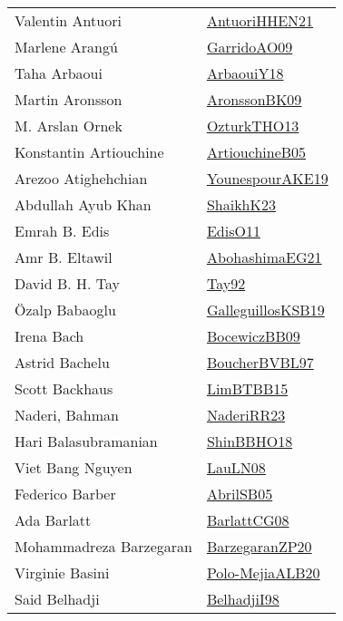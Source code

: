 {\begin{longtable}{p{4cm}p{20cm}}
Valentin Antuori & \href{papers/AntuoriHHEN21.pdf}{AntuoriHHEN21}\cite{AntuoriHHEN21} \\
Marlene Arang{\'{u}} & \href{articles/GarridoAO09.pdf}{GarridoAO09}\cite{GarridoAO09} \\
Taha Arbaoui & \href{papers/ArbaouiY18.pdf}{ArbaouiY18}\cite{ArbaouiY18} \\
Martin Aronsson & \href{papers/AronssonBK09.pdf}{AronssonBK09}\cite{AronssonBK09} \\
M. Arslan Ornek & \href{articles/OzturkTHO13.pdf}{OzturkTHO13}\cite{OzturkTHO13} \\
Konstantin Artiouchine & \href{papers/ArtiouchineB05.pdf}{ArtiouchineB05}\cite{ArtiouchineB05} \\
Arezoo Atighehchian & \href{}{YounespourAKE19}\cite{YounespourAKE19} \\
Abdullah Ayub Khan & \href{}{ShaikhK23}\cite{ShaikhK23} \\
Emrah B. Edis & \href{papers/EdisO11.pdf}{EdisO11}\cite{EdisO11} \\
Amr B. Eltawil & \href{articles/AbohashimaEG21.pdf}{AbohashimaEG21}\cite{AbohashimaEG21} \\
David B. H. Tay & \href{}{Tay92}\cite{Tay92} \\
{\"{O}}zalp Babaoglu & \href{papers/GalleguillosKSB19.pdf}{GalleguillosKSB19}\cite{GalleguillosKSB19} \\
Irena Bach & \href{}{BocewiczBB09}\cite{BocewiczBB09} \\
Astrid Bachelu & \href{}{BoucherBVBL97}\cite{BoucherBVBL97} \\
Scott Backhaus & \href{papers/LimBTBB15.pdf}{LimBTBB15}\cite{LimBTBB15} \\
Naderi, Bahman & \href{articles/NaderiRR23.pdf}{NaderiRR23}\cite{NaderiRR23} \\
Hari Balasubramanian & \href{articles/ShinBBHO18.pdf}{ShinBBHO18}\cite{ShinBBHO18} \\
Viet Bang Nguyen & \href{papers/LauLN08.pdf}{LauLN08}\cite{LauLN08} \\
Federico Barber & \href{papers/AbrilSB05.pdf}{AbrilSB05}\cite{AbrilSB05} \\
Ada Barlatt & \href{papers/BarlattCG08.pdf}{BarlattCG08}\cite{BarlattCG08} \\
Mohammadreza Barzegaran & \href{papers/BarzegaranZP20.pdf}{BarzegaranZP20}\cite{BarzegaranZP20} \\
Virginie Basini & \href{}{Polo-MejiaALB20}\cite{Polo-MejiaALB20} \\
Said Belhadji & \href{articles/BelhadjiI98.pdf}{BelhadjiI98}\cite{BelhadjiI98} \\

\end{longtable}}
